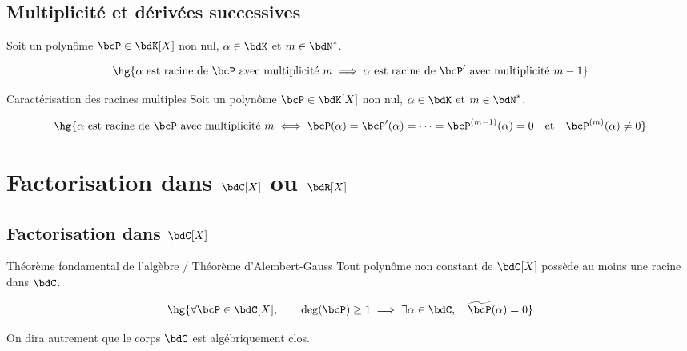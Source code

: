 \documentclass[a4paper,french,bookmarks]{article}
\begin{document}
\subsection{Multiplicité et dérivées successives}

\begin{lemma}{}{}
    Soit un polynôme $\bcP \in \bdK[X]$ non nul, $\alpha \in \bdK$ et $m \in \bdN^*$.
    
    \[\hg{\alpha \ \text{est racine de} \ \bcP \ \text{avec multiplicité} \ m \implies \alpha \ \text{est racine de} \ \bcP' \ \text{avec multiplicité} \ m-1}\]
\end{lemma}


\begin{theorem}{Caractérisation des racines multiples}{}
    Soit un polynôme $\bcP \in \bdK[X]$ non nul, $\alpha \in \bdK$ et $m \in \bdN^*$.
    
    \[\hg{\alpha \ \text{est racine de} \ \bcP \ \text{avec multiplicité} \ m \iff \bcP(\alpha) = \bcP'(\alpha) = \dots = \bcP^{(m-1)}(\alpha) = 0 \quad\text{et}\quad \bcP^{(m)}(\alpha) \neq 0}\]
\end{theorem}


\section{Factorisation dans $\bdC[X]$ ou $\bdR[X]$}

\subsection{Factorisation dans $\bdC[X]$}

\begin{theorem}{Théorème fondamental de l'algèbre / Théorème d'Alembert-Gauss}{}
    Tout polynôme non constant de $\bdC[X]$ possède au moins une racine dans $\bdC$.
    
    \[ \hg{\forall \bcP \in \bdC[X], \qquad \deg(\bcP) \geq 1 \implies \exists \alpha \in \bdC, \quad \widetilde \bcP(\alpha) = 0}\]
\end{theorem}

On dira autrement que le corps $\bdC$ est algébriquement clos.
\end{document}
